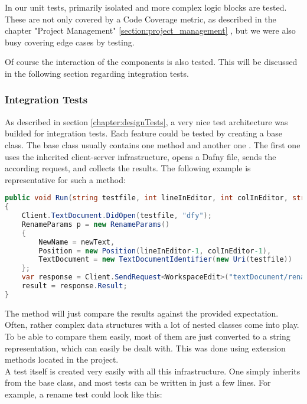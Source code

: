 In our unit tests, primarily isolated and more complex logic blocks are tested.
These are not only covered by a Code Coverage metric, as described in the chapter "Project Management"
\ref{section:project_management} ,
but we were also busy covering edge cases by testing.

Of course the interaction of the components is also tested.
This will be discussed in the following section regarding integration tests.

\subsubsection{Integration Tests}
As described in section \ref{chapter:designTests}, a very nice test architecture was builded for integration tests.
Each feature could be tested by creating a base class.
The base class usually contains one method  and another one .
The first one uses the inherited client-server infrastructure, opens a Dafny file, sends the according request, and collects the results.
The following example is representative for such a method:

\begin{lstlisting}[language=csharp, caption={Finding a Declaration}, captionpos=b, label={lst:visitorfinddecl}]
public void Run(string testfile, int lineInEditor, int colInEditor, string newText = "newText")
{
    Client.TextDocument.DidOpen(testfile, "dfy");
    RenameParams p = new RenameParams()
    {
        NewName = newText,
        Position = new Position(lineInEditor-1, colInEditor-1),
        TextDocument = new TextDocumentIdentifier(new Uri(testfile))
    };
    var response = Client.SendRequest<WorkspaceEdit>("textDocument/rename", p, CancellationSource.Token);
    result = response.Result;
}
\end{lstlisting}

The  method will just compare the results against the provided expectation.
Often, rather complex data structures with a lot of nested classes come into play.
To be able to compare them easily, most of them are just converted to a string representation, which can easily be dealt with.
This was done using extension methods located in the  project.\\

A test itself is created very easily with all this infrastructure.
One simply inherits from the base class, and most tests can be written in just a few lines.
For example, a rename test could look like this:

